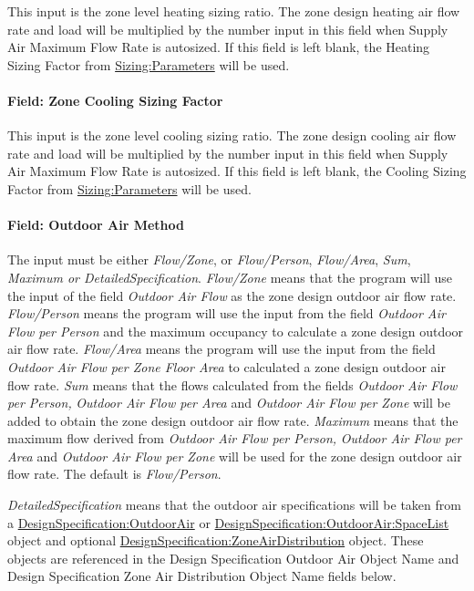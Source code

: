 This input is the zone level heating sizing ratio. The zone design heating air flow rate and load will be multiplied by the number input in this field when Supply Air Maximum Flow Rate is autosized. If this field is left blank, the Heating Sizing Factor from \hyperref[sizingparameters]{Sizing:Parameters} will be used.

\paragraph{Field: Zone Cooling Sizing Factor}\label{field-zone-cooling-sizing-factor-000}

This input is the zone level cooling sizing ratio. The zone design cooling air flow rate and load will be multiplied by the number input in this field when Supply Air Maximum Flow Rate is autosized. If this field is left blank, the Cooling Sizing Factor from \hyperref[sizingparameters]{Sizing:Parameters} will be used.

\paragraph{Field: Outdoor Air Method}\label{field-outdoor-air-method-2}

The input must be either \emph{Flow/Zone}, or \emph{Flow/Person}, \emph{Flow/Area}, \emph{Sum}, \emph{Maximum or DetailedSpecification}. \emph{Flow/Zone} means that the program will use the input of the field \emph{Outdoor Air Flow} as the zone design outdoor air flow rate. \emph{Flow/Person} means the program will use the input from the field \emph{Outdoor Air Flow per Person} and the maximum occupancy to calculate a zone design outdoor air flow rate. \emph{Flow/Area} means the program will use the input from the field \emph{Outdoor Air Flow per Zone Floor Area} to calculated a zone design outdoor air flow rate. \emph{Sum} means that the flows calculated from the fields \emph{Outdoor Air Flow per Person,} \emph{Outdoor Air Flow per Area} and \emph{Outdoor Air Flow per Zone} will be added to obtain the zone design outdoor air flow rate. \emph{Maximum} means that the maximum flow derived from \emph{Outdoor Air Flow per Person,} \emph{Outdoor Air Flow per Area} and \emph{Outdoor Air Flow per Zone} will be used for the zone design outdoor air flow rate. The default is \emph{Flow/Person}.

\emph{DetailedSpecification} means that the outdoor air specifications will be taken from a \hyperref[designspecificationoutdoorair]{DesignSpecification:OutdoorAir} or \hyperref[designspecificationoutdoorairspacelist]{DesignSpecification:OutdoorAir:SpaceList} object and optional \hyperref[designspecificationzoneairdistribution]{DesignSpecification:ZoneAirDistribution} object. These objects are referenced in the Design Specification Outdoor Air Object Name and Design Specification Zone Air Distribution Object Name fields below.

